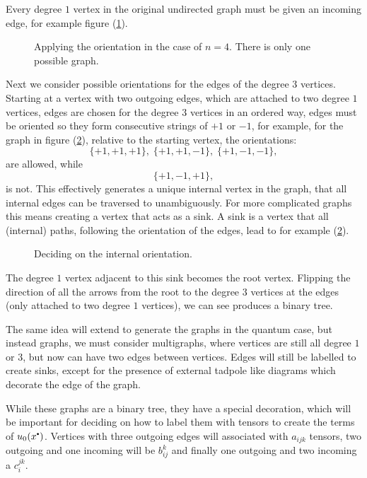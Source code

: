     Every degree \(1\) vertex in the original undirected graph must be given an incoming edge, for example figure (\ref{fig:apply_orient}). 
    \begin{figure}[h!]
        \centering
        
        \caption{Applying the orientation in the case of \(n=4\). There is only one possible graph.}
        \label{fig:apply_orient}
    \end{figure}
    Next we consider possible orientations for the edges of the degree \(3\) vertices. Starting at a vertex with two outgoing edges, which are attached to two degree \(1\) vertices, edges are chosen for the degree \(3\) vertices in an ordered way, edges must be oriented so they form consecutive strings of \(+1\) or \(-1\), for example, for the graph in figure (\ref{fig:apply_internal}), relative to the starting vertex, the orientations:
    \[ \{ +1, +1 , +1\} ,\; \{ +1, +1 ,-1  \}, \; \{+1,-1,-1\}, \]
    are allowed, while 
    \[ \{ +1,-1,+1\},\]
    is not. This effectively generates a unique internal vertex in the graph, that all internal edges can be traversed to unambiguously. For more complicated graphs this means creating a vertex that acts as a sink. A sink is a vertex that all (internal) paths, following the orientation of the edges, lead to for example (\ref{fig:apply_internal}).
    \begin{figure}[htb]
        \centering
        
        \caption{Deciding on the internal orientation.}
        \label{fig:apply_internal}
    \end{figure}
    The degree \(1\) vertex adjacent to this sink becomes the root vertex. Flipping the direction of all the arrows from the root to the degree \(3\) vertices at the edges (only attached to two degree \(1\) vertices), we can see produces a binary tree. 
    
    The same idea will extend to generate the graphs in the quantum case, but instead graphs, we must consider multigraphs, where vertices are still all degree \(1\) or \(3\), but now can have two edges between vertices. Edges will still be labelled to create sinks, except for the presence of external tadpole like diagrams which decorate the edge of the graph.
    
    While these graphs are a binary tree, they have a special decoration, which will be important for deciding on how to label them with tensors to create the terms of \( u_{0}(x^{\sbt})\). Vertices with three outgoing edges will associated with \(a_{ijk}\) tensors, two outgoing and one incoming will be \(b_{ij}^k\) and finally one outgoing and two incoming a \(c_{i}^{jk}\). 
    
